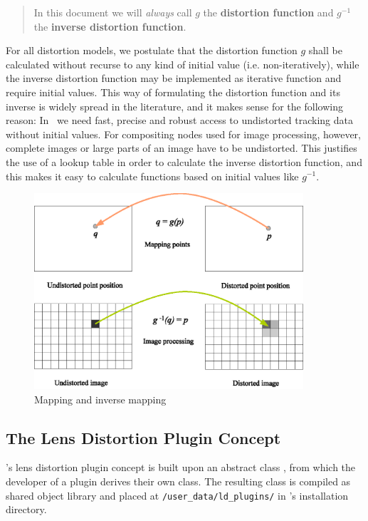 \documentclass[10pt,a4paper]{article}
\begin{document}
\begin{quote}
In this document we will {\em always} call $g$ the {\bf distortion function}
and $g^{-1}$ the {\bf inverse distortion function}.
\end{quote}

For all distortion models, we postulate that the distortion function $g$
shall be calculated without recurse to any kind of initial value (i.e. non-iteratively),
while the inverse distortion function may be implemented as iterative function
and require initial values. This way of formulating the distortion function and its inverse
is widely spread in the literature, and it makes sense for the following reason:
In \tde\ we need fast, precise and robust access to undistorted tracking data without initial values.
For compositing nodes used for image processing, however, complete images or large parts
of an image have to be undistorted. This justifies the use of a lookup table in order to calculate
the inverse distortion function, and this makes it easy to calculate functions based on initial
values like $g^{-1}$.


\begin{figure}[ht]
\centering
\includegraphics[width=10cm]{mapping_and_inverse_mapping}
\caption{Mapping and inverse mapping}
\label{fig:MappingAndInverseMapping}
\end{figure}

\subsection{The Lens Distortion Plugin Concept}
\tde's lens distortion plugin concept is built upon
an abstract class \tdeldplugin, from which the developer
of a plugin derives their own class. The resulting
class is compiled as shared object library and placed
at {\tt /user\_data/ld\_plugins/} in \tde's installation directory.
%
\end{document}
